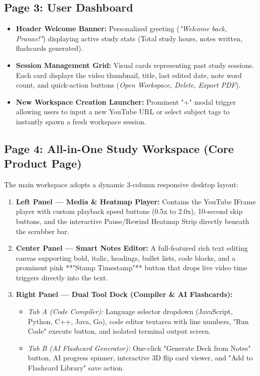 \documentclass[12pt,a4paper]{article}
\begin{document}
\subsection{Page 3: User Dashboard}
\begin{itemize}[leftmargin=1.2cm]
    \item \textbf{Header Welcome Banner:} Personalized greeting (\textit{"Welcome back, Pranav!"}) displaying active study stats (Total study hours, notes written, flashcards generated).
    \item \textbf{Session Management Grid:} Visual cards representing past study sessions. Each card displays the video thumbnail, title, last edited date, note word count, and quick-action buttons (\textit{Open Workspace, Delete, Export PDF}).
    \item \textbf{New Workspace Creation Launcher:} Prominent "+" modal trigger allowing users to input a new YouTube URL or select subject tags to instantly spawn a fresh workspace session.
\end{itemize}

\subsection{Page 4: All-in-One Study Workspace (Core Product Page)}
The main workspace adopts a dynamic 3-column responsive desktop layout:
\begin{enumerate}[leftmargin=1.2cm]
    \item \textbf{Left Panel --- Media \& Heatmap Player:}
    Contains the YouTube IFrame player with custom playback speed buttons (0.5x to 2.0x), 10-second skip buttons, and the interactive Pause/Rewind Heatmap Strip directly beneath the scrubber bar.
    \item \textbf{Center Panel --- Smart Notes Editor:}
    A full-featured rich text editing canvas supporting bold, italic, headings, bullet lists, code blocks, and a prominent pink **"Stamp Timestamp"** button that drops live video time triggers directly into the text.
    \item \textbf{Right Panel --- Dual Tool Dock (Compiler \& AI Flashcards):}
    \begin{itemize}
        \item \textit{Tab A (Code Compiler):} Language selector dropdown (JavaScript, Python, C++, Java, Go), code editor textarea with line numbers, "Run Code" execute button, and isolated terminal output screen.
        \item \textit{Tab B (AI Flashcard Generator):} One-click "Generate Deck from Notes" button, AI progress spinner, interactive 3D flip card viewer, and "Add to Flashcard Library" save action.
    \end{itemize}
\end{enumerate}
\end{document}
